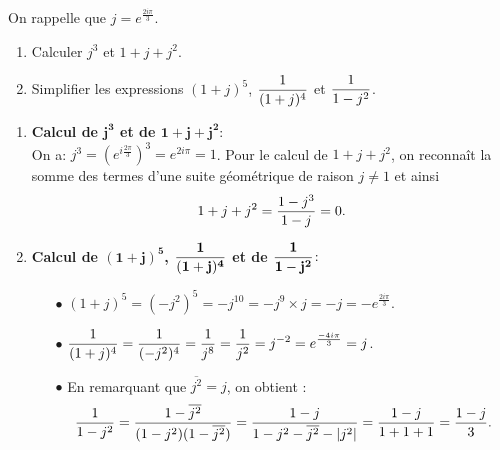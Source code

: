 \documentclass[a4paper, 11pt]{article}
\begin{document}
\begin{exercice} 
On rappelle que $j=e^{\frac{2i\pi}{3}}$.
\begin{enumerate}
\item Calculer $j^3$ et $1+j+j^2$.
\item Simplifier les expressions $(1+j)^5$, $\displaystyle\frac{1}{(1+j)^4}$ et $\displaystyle\frac{1}{1-j^2}$.
\end{enumerate}
\end{exercice}

\begin{correction}   \;
\begin{enumerate}
\item \textbf{Calcul de $\mathbf{j^3}$ et de $\mathbf{1+j+j^2}$}:\\
\noindent On a: $j^3=\left(  e^{i\frac{2\pi}{3}} \right)^3=e^{2i\pi}=1$. Pour le calcul de $1+j+j^2$, on reconna\^{i}t la somme des termes d'une suite g\'eom\'etrique de raison $j\not= 1$ et ainsi
$$1+j+j^2=\displaystyle\frac{1-j^3}{1-j}=0.$$
\item \textbf{Calcul de $\mathbf{(1+j)^5}$, $\mathbf{\displaystyle\frac{1}{(1+j)^4}}$ et de $\mathbf{\displaystyle\frac{1}{1-j^2}}$}:
\begin{itemize}
\item[$\bullet$] $(1+j)^5= (-j^2)^5= -j^{10}=-j^9\times j=-j=-e^{\frac{2i\pi}{3}}$.
\item[$\bullet$] $\displaystyle\frac{1}{(1+j)^4}=\displaystyle\frac{1}{(-j^2)^4}=\displaystyle\frac{1}{j^8}=\displaystyle\frac{1}{j^2}=j^{-2}=e^{\frac{-4i\pi}{3}}=j$.
\item[$\bullet$] En remarquant que $\overline{j^2}=j$, on obtient :
$$\displaystyle\frac{1}{1-j^2}= \frac{1-\overline{j^2}}{(1-j^2)(1-\overline{j^2})} = \frac{1-j}{1-j^2-\overline{j^2}-|j^2|} = \frac{1-j}{1+1+1} = \frac{1-j}{3}.$$
\end{itemize}
\end{enumerate}
\end{correction}




\end{document}
